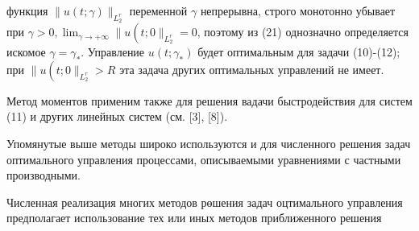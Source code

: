 \documentclass[10pt]{article}
\begin{document}
функция $\|u(t ; \gamma)\|_{L_{2}^{r}}$ переменной $\gamma$ непрерывна, строго монотонно убывает при $\gamma>0, \lim _{\gamma \rightarrow+\infty} \| u\left(t ; 0 \|_{L_{2}^{r}}=0\right.$, поэтому из (21) однозначно определяется искомое $\gamma=\gamma_{*}$. Управление $u\left(t ; \gamma_{*}\right)$ будет оптимальным для задачи (10)-(12); при $\| u\left(t ; 0 \|_{L_{2}^{r}}>R\right.$ эта задача других оптимальных управлений не имеет.



Метод моментов применим также для решения вадачи быстродействия для систем (11) и друғих линейных систем (см. [3], [8]).



Упомянутые выше методы широко используются и для численного решения задач оптимального управления процессами, описываемыми уравнениями с частными производными.



Численная реализация многих методов рөшения задач оцтимального управления предполагает использование тех или иных методов приближенного решения
\end{document}
